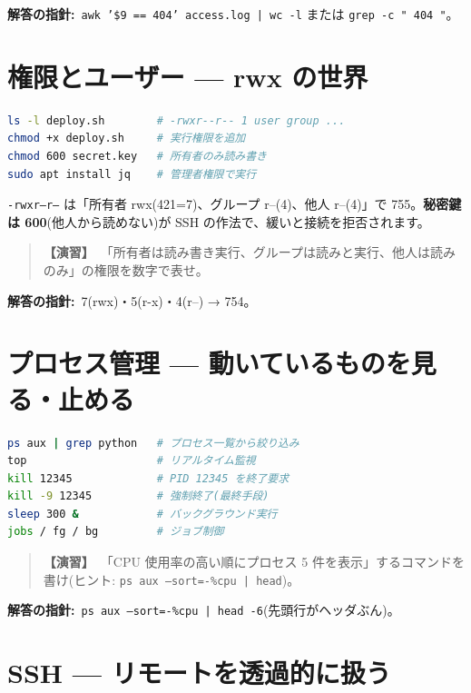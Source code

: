 \documentclass{article}
\begin{document}
\textbf{解答の指針:}\ \texttt{awk '\$9 == 404' access.log | wc -l} または \texttt{grep -c " 404 "}。

\section{権限とユーザー — rwx の世界}

\begin{lstlisting}[language=bash]
ls -l deploy.sh        # -rwxr--r-- 1 user group ...
chmod +x deploy.sh     # 実行権限を追加
chmod 600 secret.key   # 所有者のみ読み書き
sudo apt install jq    # 管理者権限で実行
\end{lstlisting}

\texttt{-rwxr--r--} は「所有者 rwx(421=7)、グループ r--(4)、他人 r--(4)」で 755。\textbf{秘密鍵は 600}(他人から読めない)が SSH の作法で、緩いと接続を拒否されます。

\begin{quote}
\textbf{【演習】}\ 「所有者は読み書き実行、グループは読みと実行、他人は読みのみ」の権限を数字で表せ。
\end{quote}

\textbf{解答の指針:}\ 7(rwx)・5(r-x)・4(r--) → 754。

\section{プロセス管理 — 動いているものを見る・止める}

\begin{lstlisting}[language=bash]
ps aux | grep python   # プロセス一覧から絞り込み
top                    # リアルタイム監視
kill 12345             # PID 12345 を終了要求
kill -9 12345          # 強制終了(最終手段)
sleep 300 &            # バックグラウンド実行
jobs / fg / bg         # ジョブ制御
\end{lstlisting}

\begin{quote}
\textbf{【演習】}\ 「CPU 使用率の高い順にプロセス 5 件を表示」するコマンドを書け(ヒント: \texttt{ps aux --sort=-\%cpu | head})。
\end{quote}

\textbf{解答の指針:}\ \texttt{ps aux --sort=-\%cpu | head -6}(先頭行がヘッダぶん)。

\section{SSH — リモートを透過的に扱う}
\end{document}
